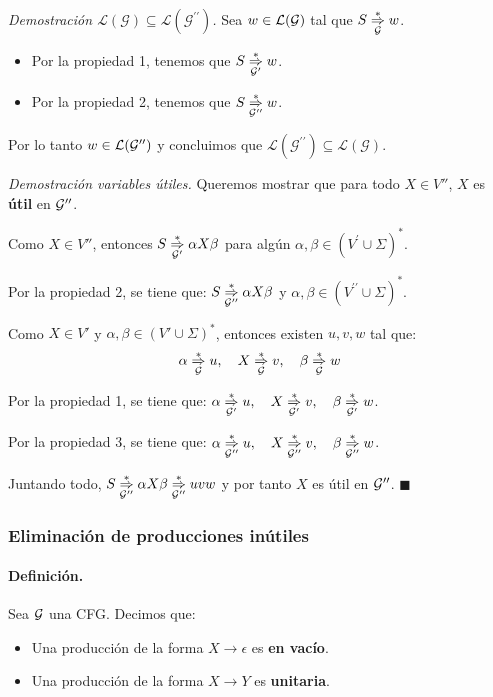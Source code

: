 \textit{Demostración $\mathcal{L}(\mathcal{G}) \subseteq \mathcal{L}\left(\mathcal{G}^{\prime \prime}\right)$.} Sea $w \in \mathcal{L}(\mathcal{G})$ tal que $S \underset{\mathcal{G}}{\overset{*}{\Rightarrow}} w$.
\begin{itemize}
    \item Por la propiedad 1, tenemos que $S \underset{\mathcal{G}'}{\overset{*}{\Rightarrow}} w$.
    \item Por la propiedad 2, tenemos que $S \underset{\mathcal{G}''}{\overset{*}{\Rightarrow}} w$.
\end{itemize}

Por lo tanto $w \in \mathcal{L}(\mathcal{G}'')$ y concluimos que $\mathcal{L}\left(\mathcal{G}^{\prime \prime}\right) \subseteq \mathcal{L}(\mathcal{G})$. \bigbreak

\textit{Demostración variables útiles.} Queremos mostrar que para todo $X \in V''$, $X$ es \textbf{útil} en $\mathcal{G}''$. \bigbreak

Como $X \in V''$, entonces $S \underset{\mathcal{G}'}{\overset{*}{\Rightarrow}} \alpha X \beta$ para algún $\alpha, \beta \in\left(V^{\prime} \cup \Sigma\right)^*$. \medbreak

Por la propiedad 2, se tiene que: $S \underset{\mathcal{G}''}{\overset{*}{\Rightarrow}} \alpha X \beta$ y $\alpha, \beta \in\left(V^{\prime \prime} \cup \Sigma\right)^*$. \medbreak

Como $X \in V'$ y $\alpha,\beta \in (V' \cup \Sigma)^*$, entonces existen $u, v, w$ tal que:
$$
    \alpha \underset{\mathcal{G}}{\overset{*}{\Rightarrow}} u, \quad X \underset{\mathcal{G}}{\overset{*}{\Rightarrow}} v, \quad \beta \underset{\mathcal{G}}{\overset{*}{\Rightarrow}} w
$$

Por la propiedad 1, se tiene que: $\alpha \underset{\mathcal{G}'}{\overset{*}{\Rightarrow}} u, \quad X \underset{\mathcal{G}'}{\overset{*}{\Rightarrow}} v, \quad \beta \underset{\mathcal{G}'}{\overset{*}{\Rightarrow}} w$. \medbreak

Por la propiedad 3, se tiene que: $\alpha \underset{\mathcal{G}''}{\overset{*}{\Rightarrow}} u, \quad X \underset{\mathcal{G}''}{\overset{*}{\Rightarrow}} v, \quad \beta \underset{\mathcal{G}''}{\overset{*}{\Rightarrow}} w$. \medbreak

Juntando todo, $S \underset{\mathcal{G}''}{\overset{*}{\Rightarrow}} \alpha X \beta \underset{\mathcal{G}''}{\overset{*}{\Rightarrow}} uvw$ y por tanto $X$ es útil en $\mathcal{G}''$. \hfill $\blacksquare$

\subsubsection{Eliminación de producciones inútiles}

\paragraph{Definición.} Sea $\mathcal{G}$ una CFG. Decimos que:
\begin{itemize}
    \item Una producción de la forma $X \to \epsilon$ es \textbf{en vacío}.
    \item Una producción de la forma $X \to Y$ es \textbf{unitaria}.
\end{itemize}

